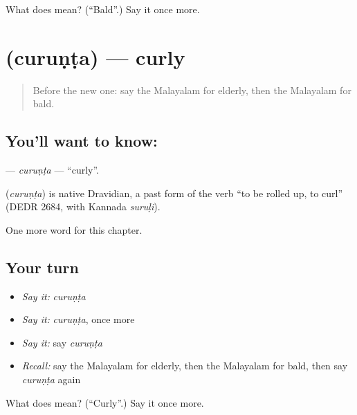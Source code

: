 \begin{tcolorbox}[breakable,colback=teal!4,colframe=teal!35!black,title={Before you move on}]
What does  mean? (\textquotedblleft{}Bald\textquotedblright{}.) Say it once more.
\end{tcolorbox}
\section[\texorpdfstring{\ml{ചുരുണ്ട} (curuṇṭa)}{ചുരുണ്ട (curuṇṭa)}]{ (curuṇṭa) — curly}

\label{lesson:ML-C247-curunta}



\begin{quote}
Before the new one: say the Malayalam for elderly, then the Malayalam for bald.
\end{quote}

\subsection*{You'll want to know: }
\textbf{} — \emph{curuṇṭa} — \textquotedblleft{}curly\textquotedblright{}.

\begin{cousinweb}
\textbf{} (\emph{curuṇṭa}) is native Dravidian, a past form of the verb \textquotedblleft{}to be rolled up, to curl\textquotedblright{} (DEDR 2684, with Kannada \emph{suruḷi}).
\end{cousinweb}

\begin{grammarlens}[title={What you've built}]
One more word for this chapter.
\end{grammarlens}

\subsection*{Your turn}
\begin{itemize}
\raggedright
  \item \emph{Say it:} \emph{curuṇṭa}
  \item \emph{Say it:} \emph{curuṇṭa}, once more
  \item \emph{Say it:} say \emph{curuṇṭa}
  \item \emph{Recall:} say the Malayalam for elderly, then the Malayalam for bald, then say \emph{curuṇṭa} again
\end{itemize}

\begin{tcolorbox}[breakable,colback=teal!4,colframe=teal!35!black,title={Before you move on}]
What does  mean? (\textquotedblleft{}Curly\textquotedblright{}.) Say it once more.
\end{tcolorbox}
